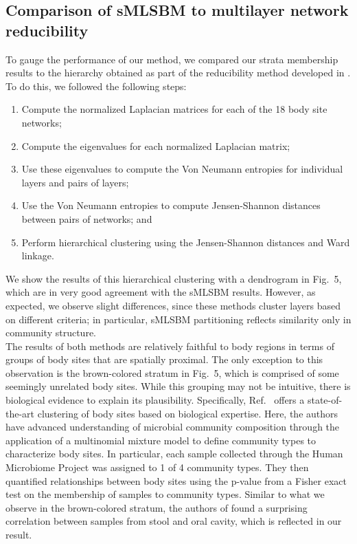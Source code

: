 \subsection{Comparison of sMLSBM to multilayer network reducibility}
To gauge the performance of our method, we compared our strata membership results to the hierarchy obtained as part of the reducibility method developed in \cite{domen}. To do this, we followed the following steps: 
\begin{enumerate}
\item Compute the normalized Laplacian matrices for each of the 18 body site networks;
\item Compute the eigenvalues for each normalized Laplacian matrix;
\item Use these eigenvalues to compute the Von Neumann entropies for individual layers and pairs of layers;
\item Use the Von Neumann entropies to compute Jensen-Shannon distances between pairs of networks; and
\item Perform hierarchical clustering using the Jensen-Shannon distances and Ward linkage. 
\end{enumerate}
We show the results of this hierarchical clustering with a dendrogram in Fig.~5, which are 
%
in very good agreement with the sMLSBM results. However, as expected, we observe slight differences, since these methods cluster layers based on different criteria; in particular, sMLSBM partitioning reflects similarity only in community structure. \\
%
\indent The results of both methods are relatively faithful to body regions in terms of groups of body sites that are spatially proximal. The only exception to this observation is the brown-colored stratum in Fig.~5, which is comprised of some seemingly unrelated body sites. While this grouping may not be intuitive, there is biological evidence to explain its plausibility. Specifically, Ref.~\cite{dingcluster} offers a state-of-the-art clustering of body sites based on biological expertise. Here, the authors have advanced understanding of microbial community composition through the application of a multinomial mixture model to define community types to characterize body sites. In particular, each sample collected through the Human Microbiome Project was assigned to 1 of 4 community types. They then quantified relationships between body sites using the p-value from a Fisher exact test on the membership of samples to community types. Similar to what we observe  in the brown-colored stratum, the authors of \cite{dingcluster} found a surprising correlation between samples from stool and oral cavity, which is reflected in our result. 

